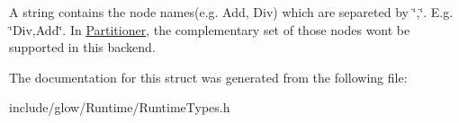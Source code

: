 A string contains the node names(e.\+g. Add, Div) which are separeted by \char`\"{},\char`\"{}. E.\+g. \char`\"{}\+Div,\+Add\char`\"{}. In \hyperlink{classglow_1_1_partitioner}{Partitioner}, the complementary set of those nodes won\textquotesingle{}t be supported in this backend. 

The documentation for this struct was generated from the following file\+:\begin{DoxyCompactItemize}
\item 
include/glow/\+Runtime/Runtime\+Types.\+h\end{DoxyCompactItemize}

